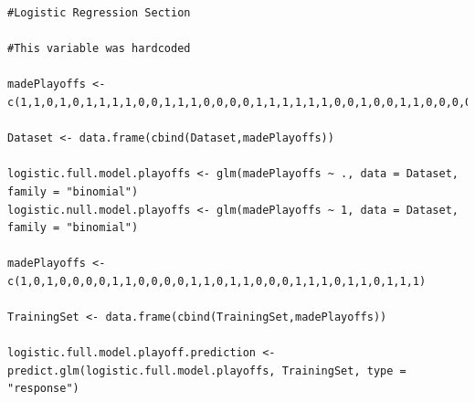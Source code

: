 \begin{verbatim}
#Logistic Regression Section

#This variable was hardcoded

madePlayoffs <- c(1,1,0,1,0,1,1,1,1,0,0,1,1,1,0,0,0,0,1,1,1,1,1,1,0,0,1,0,0,1,1,0,0,0,0,0,1,1,0,0,0,0,1,0,1,0,1,0,0,0,0,0,0,0,0,1,1,1,1,1,1,1,1,1,0,1,0,0,1,0,0,0,0,1,0,0,0,1,0,0,1,1,0,0,0,0,1,0,1,0,1,1,1,1,1,1,1,1,0,0,0,0,0,0,0,0,0,1,0,0,0,0,1,0,0,1,0,0,0,1,1,1,1,0,1,0,1,0,0,0,0,1,1,1,1,1,1,1,1,0,1,1,0,1,1,0,1,1,1,0,1,1,1,1,1,1,0,1,0,0,0,0,0,0,0,0,0,0,1,1,0,1,1,0,1,1,1,1,1,1,1,0,1,0,1,0,1,0,1,1,1,1,1,1,1,0,1,0,1,1,1,1,1,1,1,1,1,1,1,1,1,1,1,0,1,1,0,1,0,0,1,1,1,1,1,0,0,0,1,0,1,1,1,0,0,0,0,0,0,0,0,0,1,0,1,1,1,1,0,1,0,0,1,1,1,1,1,0,1,1,1,0,0,0,0,0,0,1,0,0)

Dataset <- data.frame(cbind(Dataset,madePlayoffs))

logistic.full.model.playoffs <- glm(madePlayoffs ~ ., data = Dataset, family = "binomial")
logistic.null.model.playoffs <- glm(madePlayoffs ~ 1, data = Dataset, family = "binomial")

madePlayoffs <- c(1,0,1,0,0,0,0,1,1,0,0,0,0,1,1,0,1,1,0,0,0,1,1,1,0,1,1,0,1,1,1)

TrainingSet <- data.frame(cbind(TrainingSet,madePlayoffs))

logistic.full.model.playoff.prediction <- predict.glm(logistic.full.model.playoffs, TrainingSet, type = "response")


\end{verbatim}
